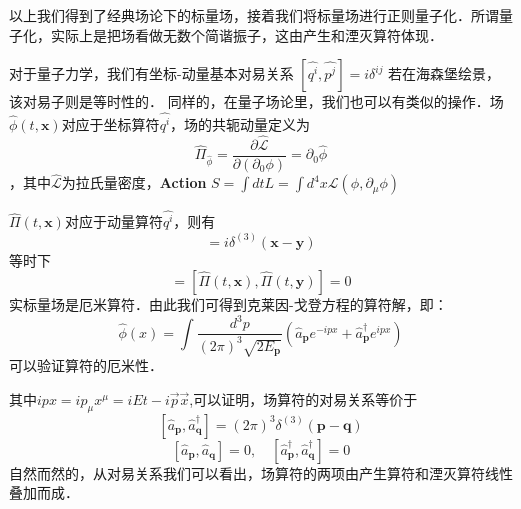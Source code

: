 \begin{corollary}{}
以上我们得到了经典场论下的标量场，接着我们将标量场进行正则量子化．所谓量子化，实际上是把场看做无数个简谐振子，这由产生和湮灭算符体现．

对于量子力学，我们有坐标-动量基本对易关系
$\left[\hat{q^{i}}, \hat{p^{j}}\right]=i \delta^{i j}$
若在海森堡绘景，该对易子则是等时性的．
同样的，在量子场论里，我们也可以有类似的操作．场$\hat{\phi}(t, \mathbf{x})$对应于坐标算符$\hat{q^{i}}$，场的共轭动量定义为\begin{equation}
\hat{\Pi}_{\hat{\phi}}=\frac{\partial \hat{\mathcal{L}}}{\partial\left(\partial_{0} \phi\right)}=\partial_{0} \hat{\phi}
\end{equation}，其中$\hat{\mathcal{L}}$为拉氏量密度，\textbf{Action} $S=\int d t L=\int d^{4} x \mathcal{L}\left(\phi, \partial_{\mu} \phi\right)$

$\hat{\Pi}(t, \mathbf{x})$对应于动量算符$\hat{q^{i}}$，则有
\begin{equation}
[\hat{\phi}(t, \mathbf{x}), \hat{\Pi}(t, \mathbf{y})]=i \delta^{(3)}(\mathbf{x}-\mathbf{y})
\end{equation}
等时下
\begin{equation}
[\hat{\phi}(t, \mathbf{x}), \hat{\phi}(t, \mathbf{y})]=[\hat{\Pi}(t, \mathbf{x}), \hat{\Pi}(t, \mathbf{y})]=0
\end{equation}
实标量场是厄米算符．由此我们可得到克莱因-戈登方程的算符解，即：
\begin{equation}
\hat{\phi}(x)=\int \frac{d^{3} p}{(2 \pi)^{3} \sqrt{2 E_{\mathbf{p}}}}\left(\hat{a}_{\mathbf{p}} e^{-i p x}+\hat{a}_{\mathbf{p}}^{\dagger} e^{i p x}\right)
\end{equation}
可以验证算符的厄米性．

其中$ipx=ip_\mu x^\mu=iEt-i\vec{p}\vec{x}$,可以证明，场算符的对易关系等价于
\begin{equation}
\left[\hat{a}_{\mathbf{p}}, \hat{a}_{\mathbf{q}}^{\dagger}\right]=(2 \pi)^{3} \delta^{(3)}(\mathbf{p}-\mathbf{q})
\end{equation}
\begin{equation}
\left[\hat{a}_{\mathbf{p}}, \hat{a}_{\mathbf{q}}\right]=0, \quad\left[\hat{a}_{\mathbf{p}}^{\dagger}, \hat{a}_{\mathbf{q}}^{\dagger}\right]=0
\end{equation}
自然而然的，从对易关系我们可以看出，场算符的两项由产生算符和湮灭算符线性叠加而成．
\end{corollary}
